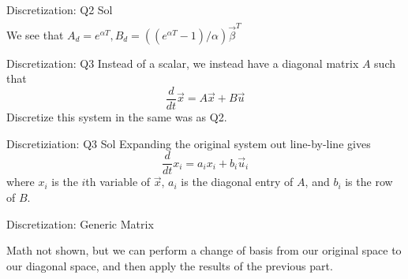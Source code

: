 \documentclass{beamer}
\begin{document}
\begin{frame}{Discretization: Q2 Sol}
\begin{align*}
	\end{align*}
	We see that $A_d = e^{\alpha T}, B_d = ((e^{\alpha T} - 1) / \alpha) \vec{\beta}^T$
	\end{frame}\begin{frame}{Discretization: Q3}
	Instead of a scalar, we instead have a diagonal matrix $A$ such that
	\[ \frac{d}{dt} \vec{x} = A \vec{x} + B \vec{u} \]
	Discretize this system in the same was as Q2.
	\end{frame}\begin{frame}{Discretiziation: Q3 Sol}
	Expanding the original system out line-by-line gives
	\[ \frac{d}{dt} x_i = a_i x_i + b_i \vec{u}_i \]
	where $x_i$ is the $i$th variable of $\vec{x}$, $a_i$ is the diagonal entry of $A$, and $b_i$ is the row of $B$.
	\end{frame}
	\begin{frame}{Discretization: Generic Matrix}
	
	Math not shown, but we can perform a change of basis from our original space to our diagonal space, and then apply the results of the previous part.
	
	\end{frame}
	
\end{document}
